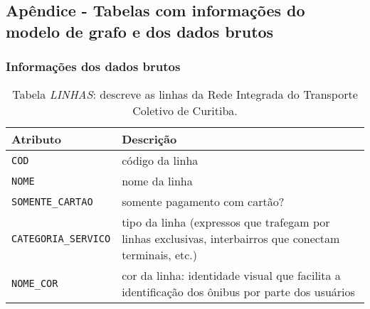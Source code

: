 
\chapter{}\label{cap:apendicea}


\section{Apêndice - Tabelas com informações do modelo de grafo e dos dados brutos}\label{sec:secaoapendicea}


\subsection{Informações dos dados brutos}

\begin{table}[htb]
    \caption{Tabela \emph{LINHAS}: descreve as linhas da Rede Integrada do Transporte Coletivo de Curitiba.}
    \centering
    \begin{tabular}{ p{5cm}p{9cm}} 
        \hline
        Atributo & Descrição\\
        \hline
         
        \texttt{COD} & código da linha   \\
        \texttt{NOME} & nome da linha   \\
        \texttt{SOMENTE\_CARTAO} & somente pagamento com cartão? \\
        \texttt{CATEGORIA\_SERVICO} & tipo da linha (expressos que trafegam por linhas exclusivas, interbairros que conectam terminais, etc.)  \\
        \texttt{NOME\_COR} & cor da linha: identidade visual que facilita a identificação dos ônibus por parte dos usuários \\ 
        \hline
        \end{tabular}
    \label{tab:linhas}
\end{table}

